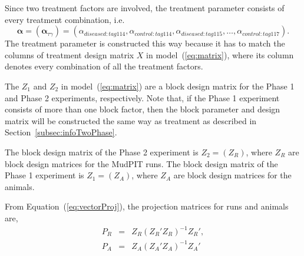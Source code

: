 \documentclass[article]{jss}
\begin{document}
Since two treatment factors are involved, the treatment parameter consists of every treatment combination, i.e. 
\begin{equation}\label{eq:treatPar}
\bm{\alpha} = (\bm{\alpha}_{\tau \gamma}) = (\alpha_{diseased:tag114}, \alpha_{control:tag114}, \alpha_{diseased:tag115}, \dots, \alpha_{control:tag117}).
\end{equation}
The treatment parameter is constructed this way because it has to match the columns of treatment design matrix $X$ in model~(\ref{eq:matrix}), where its column denotes every combination of all the treatment factors.

The $Z_1$ and $Z_2$ in model~(\ref{eq:matrix}) are a block design matrix for the Phase 1 and Phase 2 experiments, respectively. Note that, if the Phase 1 experiment consists of more than one block factor, then the block parameter and design matrix will be constructed the same way as treatment as described in Section~\ref{subsec:infoTwoPhase}.

The block design matrix of the Phase 2 experiment is $Z_2 = (Z_R)$, where $Z_R$ are block design matrices for the MudPIT runs.
The block design matrix of the Phase 1 experiment is $Z_1 = (Z_A)$, where $Z_A$ are block design matrices for the animals.


From Equation~(\ref{eq:vectorProj}), the projection matrices for runs and animals are,
\begin{eqnarray*}
P_{R} &=&  Z_{R}(Z_{R}'Z_{R})^{-1}Z_{R}',\\
P_{A} &=&  Z_{A}(Z_{A}'Z_{A})^{-1}Z_{A}'
\end{eqnarray*}
\end{document}

